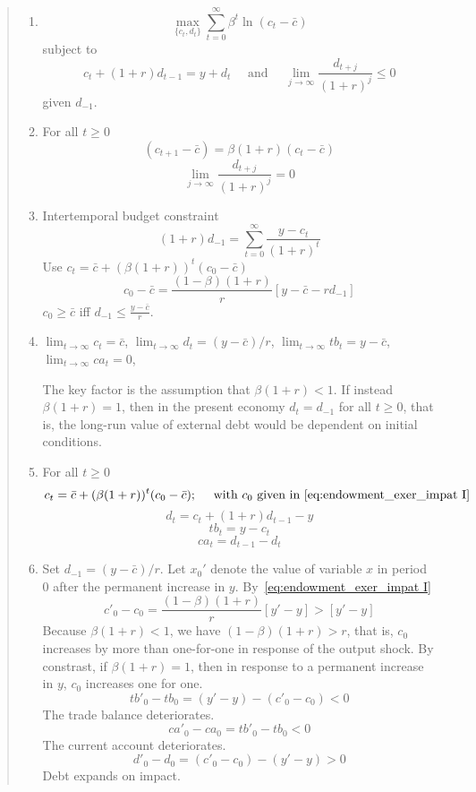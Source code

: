 \begin{exercise}
\begin{quote}
\begin{enumerate}

\item 
\[
\max_{\{c_t, d_t\}}   \sum_{t=0}^{\infty} \beta^t \ln (c_t -\bar{c})
\]
subject to 
\[
c_t + (1+r) d_{t-1} = y + d_t \quad \mbox{ and } \quad \lim_{j\rightarrow \infty} \frac{d_{t+j}}{(1+r)^j}\le 0
\]
given $d_{-1}$. 

\item 
For all $t\ge0$
\[
(c_{t+1}-\bar{c}) = \beta (1+r) (c_t-\bar{c})
\]
\[
\lim_{j\rightarrow \infty} \frac{d_{t+j}}{(1+r)^j} = 0
\]
\item 
Intertemporal budget constraint
\[
(1+r) d_{-1} = \sum_{t=0}^{\infty} \frac{y-c_t}{(1+r)^t}
\]
Use $c_t = \bar{c} +(\beta(1+r))^t(c_0-\bar{c})$
\begin{equation}
\label{eq:endowment_exer_impat I}
c_0-\bar{c} = \frac{(1-\beta)(1+r)}{r}\left[y-\bar{c} - r d_{-1}\right]
\end{equation}
$c_0\ge \bar{c}$ iff $d_{-1} \le \frac{y -\bar{c}}{r}$.  
\item 
$\lim_{t\rightarrow \infty} c_t = \bar{c}$, 
$\lim_{t\rightarrow \infty} d_t = (y-\bar{c})/r$,
$\lim_{t\rightarrow \infty} tb_t = y-\bar{c}$, 
$\lim_{t\rightarrow \infty} ca_t = 0$, 

The key factor is the assumption that $\beta(1+r)<1$. If instead $\beta(1+r)=1$, then in the present economy $d_t = d_{-1}$ for all $t\ge0$, that is, the long-run value of external debt would be dependent on initial conditions. 


\item 
For all $t\ge0$
\[
c_t = \bar{c} + (\beta (1+r))^t (c_0-\bar{c}); \quad \mbox{ with $c_0$ given in~\eqref{eq:endowment_exer_impat I}} 
\]
\[
d_t = c_t + (1+r)d_{t-1} - y
\]
\[
tb_t = y - c_t
\]
\[
ca_t = d_{t-1} - d_t
\]
\item 
Set $d_{-1} = (y-\bar{c})/r$.
Let $x_0'$ denote the value of variable $x$ in period 0 after the permanent increase in $y$. 
By~\eqref{eq:endowment_exer_impat I}
\[
c'_0-c_0 = \frac{(1-\beta)(1+r)}{r}\left[y'-y\right]>\left[y'-y\right]
\]
Because  $\beta(1+r)<1$, we have $(1-\beta)(1+r)>r$, that is, $c_0$ increases by more than one-for-one in response of the output shock. By constrast, if $\beta(1+r)=1$, then in response to a permanent increase in $y$, $c_0$ increases one for one. 
\[
tb'_0-tb_0= (y'-y) - (c'_0-c_0) <0
\]
The trade balance deteriorates. 
\[
ca'_0-ca_0= tb'_0-tb_0 <0
\]
The current account deteriorates.
\[
d'_0-d_0= (c'_0-c_0)-(y'-y) >0
\]
Debt expands on impact. 



\end{enumerate}
\end{quote}
\end{exercise}
